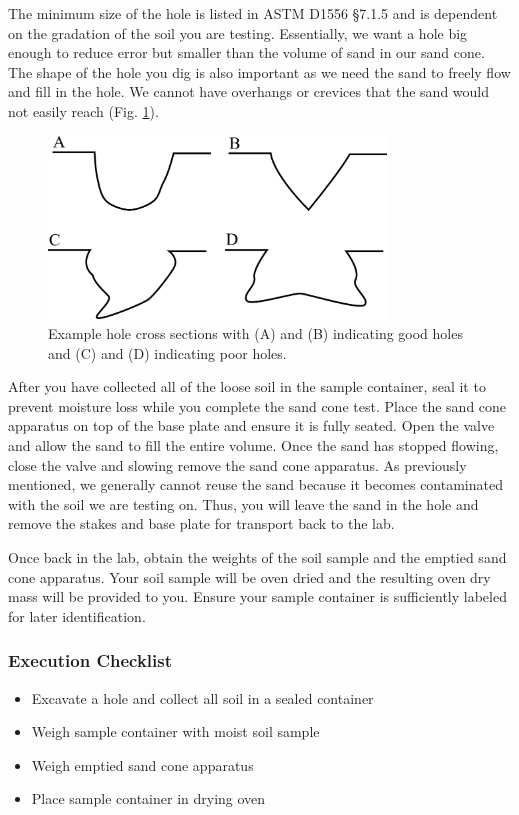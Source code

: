 \documentclass[12pt]{article}
\begin{document}
The minimum size of the hole is listed in ASTM D1556 \S7.1.5 and is dependent on the gradation of the soil you are testing. Essentially, we want a hole big enough to reduce error but smaller than the volume of sand in our sand cone. The shape of the hole you dig is also important as we need the sand to freely flow and fill in the hole. We cannot have overhangs or crevices that the sand would not easily reach (Fig. \ref{fig:hole_cross_section}).

\begin{figure}[H]
    \centering
    \includegraphics[width=0.8\textwidth]{hole_cross_section.png}
    \caption{Example hole cross sections with (A) and (B) indicating good holes and (C) and (D) indicating poor holes.}
    \label{fig:hole_cross_section}
\end{figure}

After you have collected all of the loose soil in the sample container, seal it to prevent moisture loss while you complete the sand cone test. Place the sand cone apparatus on top of the base plate and ensure it is fully seated. Open the valve and allow the sand to fill the entire volume. Once the sand has stopped flowing, close the valve and slowing remove the sand cone apparatus. As previously mentioned, we generally cannot reuse the sand because it becomes contaminated with the soil we are testing on. Thus, you will leave the sand in the hole and remove the stakes and base plate for transport back to the lab.

Once back in the lab, obtain the weights of the soil sample and the emptied sand cone apparatus. Your soil sample will be oven dried and the resulting oven dry mass will be provided to you. Ensure your sample container is sufficiently labeled for later identification.

\subsubsection*{Execution Checklist}
\begin{itemize}
    \item Excavate a hole and collect all soil in a sealed container
    \item Weigh sample container with moist soil sample
    \item Weigh emptied sand cone apparatus
    \item Place sample container in drying oven
\end{itemize}
\end{document}
